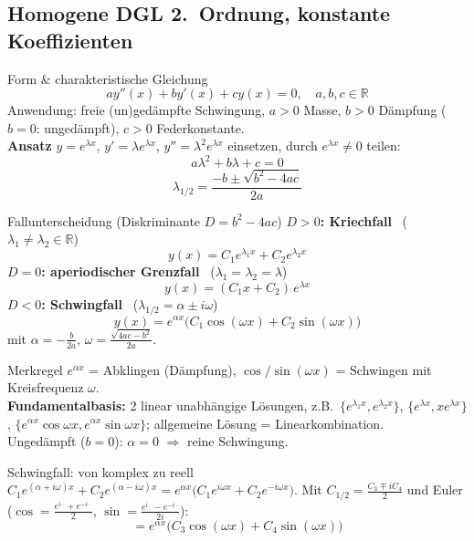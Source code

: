 \documentclass[a4paper, fontsize=7pt]{scrartcl}
\def\R{\mathbb{R}}  %
\begin{document}
\subsection{Homogene DGL 2.\ Ordnung, konstante Koeffizienten}

\begin{mainbox}{Form \& charakteristische Gleichung}
$$\boxed{ay''(x) + by'(x) + cy(x) = 0}, \quad a, b, c \in \R$$
Anwendung: freie (un)gedämpfte Schwingung, $a > 0$ Masse, $b > 0$
Dämpfung ($b = 0$: ungedämpft), $c > 0$ Federkonstante.\\
\textbf{Ansatz} $y = e^{\lambda x}$, $y' = \lambda e^{\lambda x}$,
$y'' = \lambda^2 e^{\lambda x}$ einsetzen, durch $e^{\lambda x} \ne 0$
teilen:
$$\boxed{a\lambda^2 + b\lambda + c = 0}$$
$$\lambda_{1/2} = \frac{-b \pm \sqrt{b^2 - 4ac}}{2a}$$
\end{mainbox}

\begin{mainbox}{Fallunterscheidung (Diskriminante $D = b^2 - 4ac$)}
\textbf{$D > 0$: Kriechfall} \ ($\lambda_1 \ne \lambda_2 \in \R$)
$$y(x) = C_1 e^{\lambda_1 x} + C_2 e^{\lambda_2 x}$$
\textbf{$D = 0$: aperiodischer Grenzfall} \ ($\lambda_1 = \lambda_2 =
\lambda$)
$$y(x) = (C_1 x + C_2)\, e^{\lambda x}$$
\textbf{$D < 0$: Schwingfall} \ ($\lambda_{1/2} = \alpha \pm i\omega$)
$$y(x) = e^{\alpha x}\big(C_1\cos(\omega x) + C_2\sin(\omega x)\big)$$
mit $\alpha = -\frac{b}{2a}$, $\omega = \frac{\sqrt{4ac - b^2}}{2a}$.
\end{mainbox}

\begin{subbox}{Merkregel}
$e^{\alpha x}$ = Abklingen (Dämpfung), $\cos/\sin(\omega x)$ = Schwingen
mit Kreisfrequenz $\omega$.\\
\textbf{Fundamentalbasis:} 2 linear unabhängige Lösungen, z.B.\
$\{e^{\lambda_1 x}, e^{\lambda_2 x}\}$, $\{e^{\lambda x}, xe^{\lambda
x}\}$, $\{e^{\alpha x}\cos\omega x, e^{\alpha x}\sin\omega x\}$;
allgemeine Lösung = Linearkombination.\\
Ungedämpft ($b = 0$): $\alpha = 0$ $\Rightarrow$ reine Schwingung.
\end{subbox}

\begin{subbox}{Schwingfall: von komplex zu reell}
$C_1 e^{(\alpha + i\omega)x} + C_2 e^{(\alpha - i\omega)x}
= e^{\alpha x}\big(C_1 e^{i\omega x} + C_2 e^{-i\omega x}\big)$.
Mit $C_{1/2} = \frac{C_3 \mp iC_4}{2}$ und Euler
($\cos = \frac{e^{i\cdot} + e^{-i\cdot}}{2}$,
$\sin = \frac{e^{i\cdot} - e^{-i\cdot}}{2i}$):
$$= e^{\alpha x}\big(C_3\cos(\omega x) + C_4\sin(\omega x)\big)$$
\end{subbox}
\end{document}
